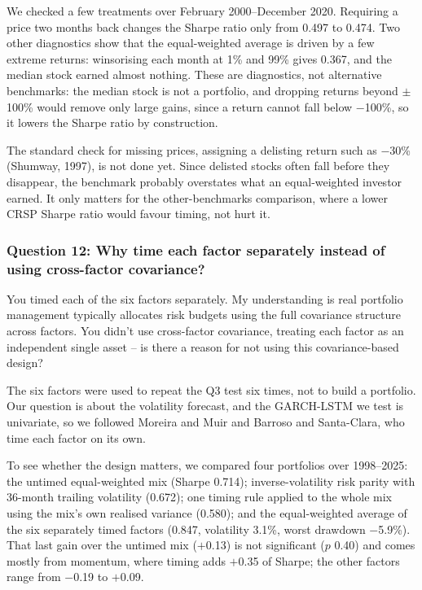 We checked a few treatments over February 2000--December 2020. Requiring a price two months back changes the Sharpe ratio only from 0.497 to 0.474. Two other diagnostics show that the equal-weighted average is driven by a few extreme returns: winsorising each month at 1\% and 99\% gives 0.367, and the median stock earned almost nothing. These are diagnostics, not alternative benchmarks: the median stock is not a portfolio, and dropping returns beyond $\pm$100\% would remove only large gains, since a return cannot fall below $-$100\%, so it lowers the Sharpe ratio by construction.

The standard check for missing prices, assigning a delisting return such as $-$30\% (Shumway, 1997), is not done yet. Since delisted stocks often fall before they disappear, the benchmark probably overstates what an equal-weighted investor earned. It only matters for the other-benchmarks comparison, where a lower CRSP Sharpe ratio would favour timing, not hurt it.

\subsubsection*{Question 12: Why time each factor separately instead of using cross-factor covariance?}
\begin{question}
You timed each of the six factors separately. My understanding is real portfolio management typically allocates risk budgets using the full covariance structure across factors. You didn't use cross-factor covariance, treating each factor as an independent single asset -- is there a reason for not using this covariance-based design?
\end{question}
The six factors were used to repeat the Q3 test six times, not to build a portfolio. Our question is about the volatility forecast, and the GARCH-LSTM we test is univariate, so we followed Moreira and Muir and Barroso and Santa-Clara, who time each factor on its own.

To see whether the design matters, we compared four portfolios over 1998--2025: the untimed equal-weighted mix (Sharpe 0.714); inverse-volatility risk parity with 36-month trailing volatility (0.672); one timing rule applied to the whole mix using the mix's own realised variance (0.580); and the equal-weighted average of the six separately timed factors (0.847, volatility 3.1\%, worst drawdown $-$5.9\%). That last gain over the untimed mix ($+$0.13) is not significant ($p$ 0.40) and comes mostly from momentum, where timing adds $+$0.35 of Sharpe; the other factors range from $-$0.19 to $+$0.09.

